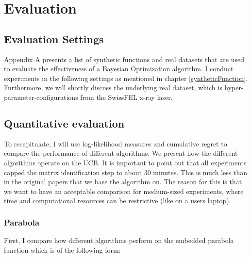 \chapter{Evaluation}

\ifpdf
    \graphicspath{{07_Chapter6/Figs/Raster/}{07_Chapter6/Figs/PDF/}{07_Chapter6/Figs/}}
\else
    \graphicspath{{07_Chapter6/Figs/Vector/}{07_Chapter6/Figs/}}
\fi

\section{Evaluation Settings}

Appendix A presents a list of synthetic functions and real datasets that are used to evaluate the effectiveness of a Bayesian Optimization algorithm. 
I conduct experiments in the following settings as mentioned in chapter \ref{syntheticFunction}.
Furthermore, we will shortly discuss the underlying real dataset, which is hyper-parameter-configurations from the SwissFEL x-ray laser.

\section{Quantitative evaluation}
To recapitulate, I will use log-likelihood measures and cumulative regret to compare the performance of different algorithms.
We present how the different algorithms operate on the UCB.
It is important to point out that all experiments capped the matrix identification step to about 30 minutes.
This is much less than in the original papers that we base the algorithm on.
The reason for this is that we want to have an acceptable comparison for medium-sized experiments, where time and computational resources can be restrictive (like on a users laptop).

\subsection{Parabola}
First, I compare how different algorithms perform on the embedded parabola function which is of the following form:

\def\WParaboa2D{
\begin{bmatrix}
    0.500\\
    0.192
\end{bmatrix}}


